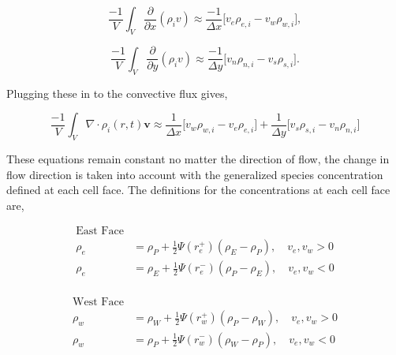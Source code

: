 \begin{equation}
    \frac{-1}{V}\int_{V}\frac{\partial}{\partial x}(\rho_{i}v) \approx \frac{-1}{\Delta x} \big[ v_{e}\rho_{e,i} - v_{w}\rho_{w,i} \big],
\end{equation}
    
\begin{equation}
    \frac{-1}{V}\int_{V}\frac{\partial}{\partial y}(\rho_{i}v) \approx \frac{-1}{\Delta y} \big[ v_{n}\rho_{n,i} - v_{s}\rho_{s,i} \big].
\end{equation}

\noindent Plugging these in to the convective flux gives,

\begin{equation}
    \frac{-1}{V}\int_{V}\nabla \cdot \rho_{i}(r,t)\boldsymbol{v} \approx 
    \frac{1}{\Delta x} \big[ v_{w}\rho_{w,i} - v_{e}\rho_{e,i} \big] + \frac{1}{\Delta y} \big[ v_{s}\rho_{s,i} - v_{n}\rho_{n,i} \big]
\end{equation}

\noindent These equations remain constant no matter the direction of flow, the change in flow direction is taken into account with the generalized species concentration defined at each cell face. The definitions for the concentrations at each cell face are,

\begin{equation}
\begin{split}
    \text{East Face} \\ 
    \rho_{e} &= \rho_{P} + \frac{1}{2}\Psi(r_{e}^{+})(\rho_{E} - \rho_{P}), \quad v_{e}, v_{w} > 0 \\
    \rho_{e} &= \rho_{E} + \frac{1}{2}\Psi(r_{e}^{-})(\rho_{P} - \rho_{E}), \quad v_{e}, v_{w} < 0 \\
    \label{eq:eastFaceFlux}
\end{split}
\end{equation}

\vspace{-2cm}

\begin{equation}
\begin{split}
    \text{West Face} \\
    \rho_{w} &= \rho_{W} + \frac{1}{2}\Psi(r_{w}^{+})(\rho_{P} - \rho_{W}), \quad v_{e}, v_{w} > 0 \\
    \rho_{w} &= \rho_{P} + \frac{1}{2}\Psi(r_{w}^{-})(\rho_{W} - \rho_{P}), \quad v_{e}, v_{w} < 0 \\
    \label{eq:westFaceFlux}
\end{split} 
\end{equation}

